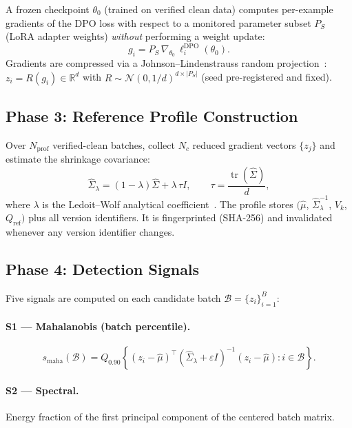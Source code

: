 \documentclass[runningheads]{llncs}
\newcommand{\R}{\mathbb{R}}
\newcommand{\B}{\mathcal{B}}
\begin{document}
A frozen checkpoint $\theta_0$ (trained on verified clean data) computes
per-example gradients of the DPO loss with respect to a monitored parameter
subset $P_S$ (LoRA adapter weights) \emph{without} performing a weight update:
\begin{equation}
  g_i = P_S\,\nabla_{\theta_0}\,\ell_i^{\text{DPO}}(\theta_0).
  \label{eq:probe}
\end{equation}
Gradients are compressed via a Johnson--Lindenstrauss random
projection~\cite{johnson1984extensions,achlioptas2003database}:
$z_i = R(g_i) \in \R^d$ with $R \sim \mathcal{N}(0, 1/d)^{d \times |P_S|}$
(seed pre-registered and fixed).

\subsection{Phase 3: Reference Profile Construction}

Over $N_{\text{prof}}$ verified-clean batches, collect $N_c$ reduced gradient
vectors $\{z_j\}$ and estimate the shrinkage covariance:
\begin{equation}
  \hat{\Sigma}_\lambda = (1-\lambda)\hat{\Sigma} + \lambda\,\tau I, \qquad
  \tau = \frac{\operatorname{tr}(\hat{\Sigma})}{d},
  \label{eq:shrinkage}
\end{equation}
where $\lambda$ is the Ledoit--Wolf analytical coefficient~\cite{ledoit2004well}.
The profile stores
$(\hat{\mu}$, $\hat{\Sigma}_\lambda^{-1}$, $V_k$, $Q_{\text{ref}})$
plus all version identifiers. It is fingerprinted (SHA-256) and invalidated
whenever any version identifier changes.

\subsection{Phase 4: Detection Signals}

Five signals are computed on each candidate batch $\B = \{z_i\}_{i=1}^{B}$:

\paragraph{S1 --- Mahalanobis (batch percentile).}
\begin{equation}
  s_{\text{maha}}(\B) = Q_{0.90}\!\left\{
    (z_i - \hat{\mu})^\top(\hat{\Sigma}_\lambda + \varepsilon I)^{-1}(z_i - \hat{\mu})
    : i \in \B
  \right\}.
  \label{eq:maha}
\end{equation}

\paragraph{S2 --- Spectral.}
Energy fraction of the first principal component of the centered batch matrix.
\end{document}
